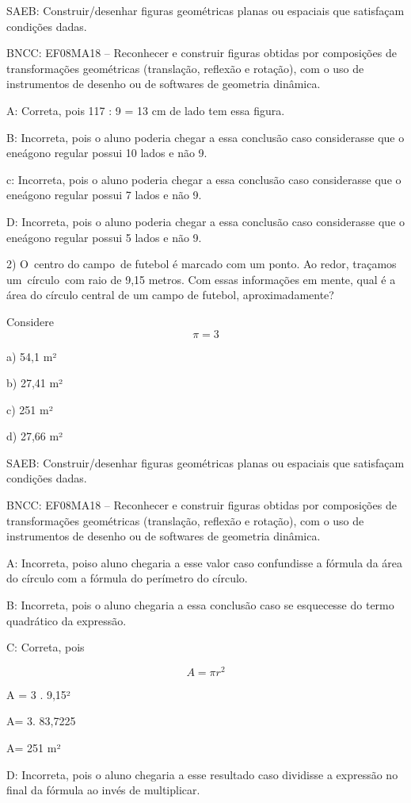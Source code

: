 SAEB: Construir/desenhar figuras geométricas planas ou espaciais que
satisfaçam condições dadas.

BNCC: EF08MA18 -- Reconhecer e construir figuras obtidas por composições
de transformações geométricas (translação, reflexão e rotação), com o
uso de instrumentos de desenho ou de softwares de geometria dinâmica.

A: Correta, pois 117 : 9 = 13 cm de lado tem essa figura.

B: Incorreta, pois o aluno poderia chegar a essa conclusão caso
considerasse que o eneágono regular possui 10 lados e não 9.

c: Incorreta, pois o aluno poderia chegar a essa conclusão caso
considerasse que o eneágono regular possui 7 lados e não 9.

D: Incorreta, pois o aluno poderia chegar a essa conclusão caso
considerasse que o eneágono regular possui 5 lados e não 9.

2) O~centro do campo~de futebol é marcado com um ponto. Ao redor,
traçamos um~círculo~com raio de 9,15 metros. Com essas informações em
mente, qual é a área do círculo central de um campo de futebol,
aproximadamente?

Considere \[\pi = 3\]

a) 54,1 m²

b) 27,41 m²

c) 251 m²

d) 27,66 m²

SAEB: Construir/desenhar figuras geométricas planas ou espaciais que
satisfaçam condições dadas.

BNCC: EF08MA18 -- Reconhecer e construir figuras obtidas por composições
de transformações geométricas (translação, reflexão e rotação), com o
uso de instrumentos de desenho ou de softwares de geometria dinâmica.

A: Incorreta, poiso aluno chegaria a esse valor caso confundisse a
fórmula da área do círculo com a fórmula do perímetro do círculo.

B: Incorreta, pois o aluno chegaria a essa conclusão caso se esquecesse
do termo quadrático da expressão.

C: Correta, pois

\[A = \pi r^{2}\]

A = 3 . 9,15²

A= 3. 83,7225

A= 251 m²

D: Incorreta, pois o aluno chegaria a esse resultado caso dividisse a
expressão no final da fórmula ao invés de multiplicar.

